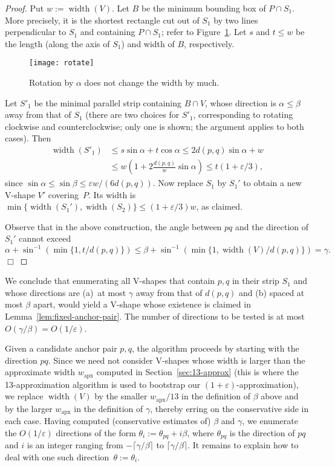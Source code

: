 \documentclass{llncs}
\newcommand{\wapp}{w_{\mathrm{apx}}}
\let\eps\varepsilon
\DeclareMathOperator{\width}{width}
\begin{document}
\begin{proof}
  Put $w:=\width(V)$.  Let $B$ be the minimum bounding box of $P \cap
  S_1$.  More precisely, it is the shortest rectangle cut out of $S_1$
  by two lines perpendicular to $S_1$ and containing $P \cap S_1$;
  refer to Figure~\ref{fig:rotated}.  Let $s$ and $t\leq w$ be the
  length (along the axis of $S_1$) and width of $B$, respectively.
\begin{figure}
 \centering
    \texttt{[image: rotate]}
    \caption{Rotation by $\alpha$ does not change the width by much.}
    \label{fig:rotated}
\end{figure}
Let $S'_1$ be the minimal parallel strip containing $B\cap V$, whose
  direction is $\alpha \leq \beta$ away from that of $S_1$ (there are two choices for $S'_1$, corresponding to
  rotating clockwise and counterclockwise; only one is shown; the
  argument applies to both cases).  
  Then
  \begin{align*}
    \width(S'_1) & \leq s \sin \alpha + t \cos \alpha 
    \leq  2d(p,q) \sin \alpha + w \\
    & \leq w ( 1 + 2 \frac{d(p,q)}{w} \sin\alpha ) \leq t (1 + \eps/3),
  \end{align*}
  since $\sin \alpha \leq \sin\beta \leq \eps w/(6 d(p,q))$.  Now
  replace $S_1$ by $S_1'$ to obtain a new V-shape $V'$ covering~$P$.
  Its width is $\min\{\width(S_1'),\width(S_2)\}\leq(1+\eps/3)w$, as
  claimed.

  Observe that in the above construction, the angle between $pq$ and
  the direction of $S_1'$ cannot exceed
  \[\alpha+\sin^{-1}(\min\{1,t/d(p,q)\}) \leq \beta +
  \sin^{-1}(\min\{1,\width(V)/d(p,q)\}) = \gamma.\] \hfill $\Box$
  \end{proof} 

We conclude that enumerating all V-shapes that contain $p,q$ in their
strip $S_1$ and whose directions are (a)~at most $\gamma$ away from
that of $d(p,q)$ and (b) spaced at most $\beta$ apart, would yield a
V-shape whose existence is claimed in
Lemma~\ref{lem:fixed-anchor-pair}.  The number of directions to be
tested is at most $O(\gamma/\beta)=O(1/\eps)$.

Given a candidate anchor pair $p,q$, the algorithm proceeds by
starting with the direction $pq$.  Since we need not consider V-shapes
whose width is larger than the approximate width $\wapp$ computed in
Section~\ref{sec:13-approx} (this is where the 13-approximation
algorithm is used to bootstrap our $(1+\eps)$-approximation), we
replace $\width(V)$ by the smaller $\wapp/13$ in the
definition of $\beta$ above and by the larger $\wapp$ in the
definition of $\gamma$, thereby erring on the conservative side in
each case.  Having computed (conservative estimates of) $\beta$ and
$\gamma$, we enumerate the $O(1/\eps)$ directions of the form
$\theta_i:=\theta_{pq}+i\beta$, where $\theta_{pq}$ is the direction
of $pq$ and $i$ is an integer ranging from $-\lceil
\gamma/\beta\rceil$ to $\lceil \gamma/\beta\rceil$.  It remains to
explain how to deal with one such direction~$\theta:=\theta_i$.
\end{document}

